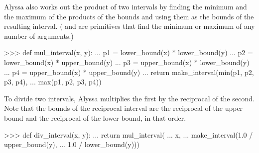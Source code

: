 \noindent
Alyssa also works out the product of two intervals by finding the minimum and
the maximum of the products of the bounds and using them as the bounds of the
resulting interval.  ( and  are primitives that find the
minimum or maximum of any number of arguments.)

\begin{codeBlock}
>>> def mul_interval(x, y):
...     p1 = lower_bound(x) * lower_bound(y)
...     p2 = lower_bound(x) * upper_bound(y)
...     p3 = upper_bound(x) * lower_bound(y)
...     p4 = upper_bound(x) * upper_bound(y)
...     return make_interval(min(p1, p2, p3, p4),
...                          max(p1, p2, p3, p4))
\end{codeBlock}

\noindent
To divide two intervals, Alyssa multiplies the first by the reciprocal of the
second.  Note that the bounds of the reciprocal interval are the reciprocal of
the upper bound and the reciprocal of the lower bound, in that order.

\begin{codeBlock}
>>> def div_interval(x, y):
...     return mul_interval(
...         x,
...         make_interval(1.0 / upper_bound(y),
...                       1.0 / lower_bound(y)))
\end{codeBlock}

